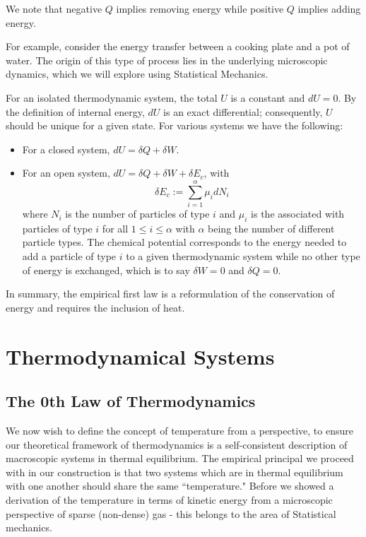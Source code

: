 \documentclass[12pt, a4paper, oneside, openright, titlepage]{book}
\begin{document}
We note that negative $Q$ implies removing energy while positive $Q$ implies adding energy.

For example, consider the energy transfer between a cooking plate and a pot of water. The origin of this type of process lies in the underlying microscopic dynamics, which we will explore using Statistical Mechanics. 

\begin{law}
    For an isolated thermodynamic system, the total  $U$ is a constant and $dU = 0$. By the definition of internal energy, $dU$ is an exact differential; consequently, $U$ should be unique for a given state. For various systems we have the following: \begin{itemize}
        \item For a closed system, $dU = \delta Q + \delta W$. 
        \item For an open system, $dU = \delta Q + \delta W + \delta E_c$, with $$\delta E_c := \sum_{i=1}^{\alpha}\mu_idN_i$$ where $N_i$ is the number of particles of type $i$ and $\mu_i$ is the  associated with particles of type $i$ for all $1 \leq i \leq \alpha$ with $\alpha$ being the number of different particle types. The chemical potential corresponds to the energy needed to add a particle of type $i$ to a given thermodynamic system while no other type of energy is exchanged, which is to say $\delta W = 0$ and $\delta Q = 0$.
    \end{itemize}
\end{law}

In summary, the empirical first law is a reformulation of the conservation of energy and requires the inclusion of heat. 





\chapter{Thermodynamical Systems}


\section{The 0th Law of Thermodynamics}

We now wish to define the concept of temperature from a  perspective, to ensure our theoretical framework of thermodynamics is a self-consistent description of macroscopic systems in thermal equilibrium. The empirical principal we proceed with in our construction is that two systems which are in thermal equilibrium with one another should share the same ``temperature." Before we showed a derivation of the temperature in terms of kinetic energy from a microscopic perspective of sparse (non-dense) gas - this belongs to the area of Statistical mechanics.
\end{document}
